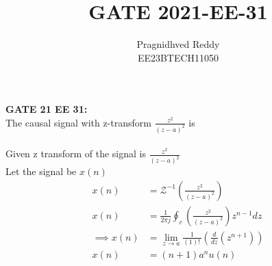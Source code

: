 \documentclass[journal,12pt,twocolumn]{IEEEtran}
\title{GATE 2021-EE-31}
\author{Pragnidhved Reddy\\EE23BTECH11050}
\date{}
\begin{document}
\maketitle
\newpage
\bigskip
\textbf{GATE 21 EE 31:}\\
The causal signal with z-transform $\frac{z^2}{(z-a)^{2}}$ is \\
\solution\\
Given z transform of the signal is $\frac{z^2}{(z-a)^{2}}$\\
Let the signal be $x(n)$
\begin{align}
x(n)&=\mathcal{Z}^{-1}\left(\frac{z^2}{(z-a)^{2}}\right)\\[6pt]
x(n)&=\frac{1}{2\pi j}\oint_{c}\left(\frac{z^2}{(z-a)^{2}}\right) z^{n-1}dz\\[6pt]
\implies x(n)&=\lim_{z\to a}\frac{1}{(1)\displaystyle !\,}\left(\frac{d}{dz}(z^{n+1})\right)\\[6pt]
x(n)&=(n+1)a^n u(n)
\end{align}
\end{document}
